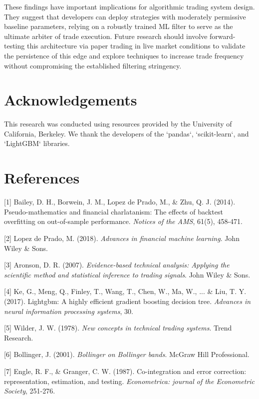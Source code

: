 \documentclass[12pt]{article}
\begin{document}
These findings have important implications for algorithmic trading system design. They suggest that developers can deploy strategies with moderately permissive baseline parameters, relying on a robustly trained ML filter to serve as the ultimate arbiter of trade execution. Future research should involve forward-testing this architecture via paper trading in live market conditions to validate the persistence of this edge and explore techniques to increase trade frequency without compromising the established filtering stringency. 

\section*{Acknowledgements}

This research was conducted using resources provided by the University of California, Berkeley. We thank the developers of the `pandas`, `scikit-learn`, and `LightGBM` libraries.

\section*{References}

[1] Bailey, D. H., Borwein, J. M., Lopez de Prado, M., \& Zhu, Q. J. (2014). Pseudo-mathematics and financial charlatanism: The effects of backtest overfitting on out-of-sample performance. \textit{Notices of the AMS}, 61(5), 458-471.

[2] Lopez de Prado, M. (2018). \textit{Advances in financial machine learning}. John Wiley \& Sons.

[3] Aronson, D. R. (2007). \textit{Evidence-based technical analysis: Applying the scientific method and statistical inference to trading signals}. John Wiley \& Sons.

[4] Ke, G., Meng, Q., Finley, T., Wang, T., Chen, W., Ma, W., ... \& Liu, T. Y. (2017). Lightgbm: A highly efficient gradient boosting decision tree. \textit{Advances in neural information processing systems}, 30.

[5] Wilder, J. W. (1978). \textit{New concepts in technical trading systems}. Trend Research.

[6] Bollinger, J. (2001). \textit{Bollinger on Bollinger bands}. McGraw Hill Professional.

[7] Engle, R. F., \& Granger, C. W. (1987). Co-integration and error correction: representation, estimation, and testing. \textit{Econometrica: journal of the Econometric Society}, 251-276.
\end{document}
